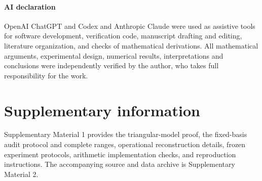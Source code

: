 \documentclass[11pt]{article}
\theoremstyle{definition}
\theoremstyle{remark}
\begin{document}
\paragraph{AI declaration}
OpenAI ChatGPT and Codex and Anthropic Claude were used as assistive tools for software
development, verification code, manuscript drafting and editing, literature organization, and
checks of mathematical derivations. All mathematical arguments, experimental design, numerical
results, interpretations and conclusions were independently verified by the author, who takes
full responsibility for the work.

\section*{Supplementary information}
Supplementary Material 1 provides the triangular-model proof, the fixed-basis audit protocol and
complete ranges, operational reconstruction details, frozen experiment protocols, arithmetic
implementation checks, and reproduction instructions. The accompanying source and data archive
is Supplementary Material 2.



\end{document}
